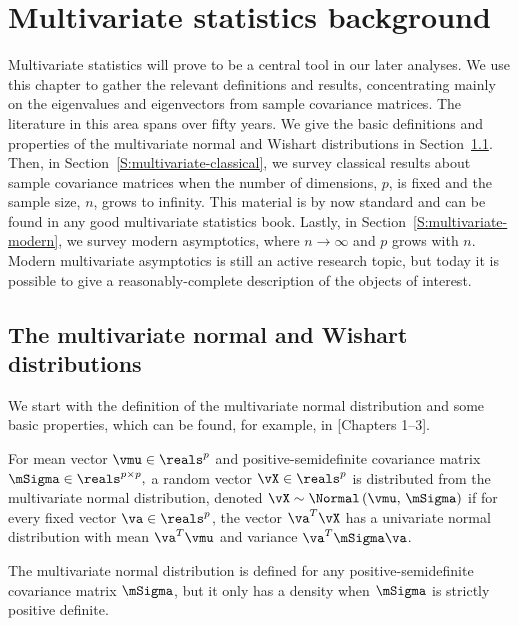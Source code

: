 
\chapter{Multivariate statistics background}

Multivariate statistics will prove to be a central tool in our later analyses.  We use this chapter to gather the relevant definitions and results, concentrating mainly on the eigenvalues and eigenvectors from sample covariance matrices.  The literature in this area spans over fifty years.  We give the basic definitions and properties of the multivariate normal and Wishart distributions in Section~\ref{S:mulitivariate-definitions}.  Then, in Section~\ref{S:multivariate-classical}, we survey classical results about sample covariance matrices when the number of dimensions, $p$, is fixed and the sample size, $n$, grows to infinity.  This material is by now standard and can be found in any good multivariate statistics book.  Lastly,  in Section~\ref{S:multivariate-modern}, we survey modern asymptotics, where $n \to \infty$ and $p$ grows with $n$.  Modern multivariate asymptotics is still an active research topic, but today it is possible to give a reasonably-complete description of the objects of interest.

\section{The multivariate normal and Wishart distributions}\label{S:mulitivariate-definitions}

We start with the definition of the multivariate normal distribution and some basic properties, which can be found, for example, in \cite{muirhead1982ams}[Chapters 1--3].

\begin{definition}
    \label{D:multivariate-normal}
For mean vector 
\(
    \vmu \in \reals^p
\)
and positive-semidefinite covariance matrix
\(
    \mSigma \in \reals^{p\times p},
\)
a random vector 
\(
    \vX \in \reals^p
\)
is distributed from the multivariate normal distribution, denoted 
\(
    \vX 
    \sim 
    \Normal \left(
        \vmu, \,
        \mSigma
    \right)
\)
if for every fixed vector $\va \in \reals^p$, the vector
$\va^T \vX$ has a univariate normal distribution with mean
\(
    \va^T \vmu
\)
and variance
\(
    \va^T \mSigma \va
\).
\end{definition}

\noindent
The multivariate normal distribution is defined for any positive-semidefinite covariance matrix $\mSigma$, but it only has a density when $\mSigma$ is strictly positive definite.

